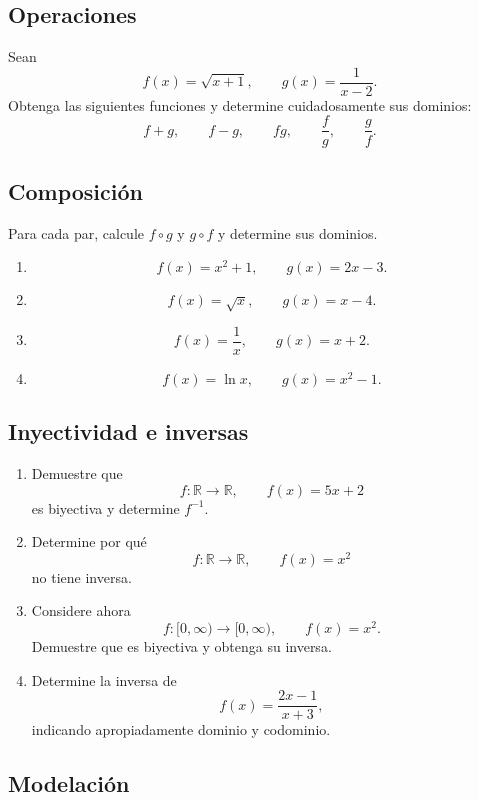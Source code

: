 \documentclass[12pt]{article}
\theoremstyle{remark}
\newcommand{\R}{\mathbb{R}}
\begin{document}
\subsection{Operaciones}

Sean
\[
f(x)=\sqrt{x+1},
\qquad
g(x)=\frac{1}{x-2}.
\]
Obtenga las siguientes funciones y determine cuidadosamente sus dominios:
\[
f+g,\qquad f-g,\qquad fg,\qquad\frac fg,\qquad\frac gf.
\]

\subsection{Composición}

Para cada par, calcule $f\circ g$ y $g\circ f$ y determine sus dominios.

\begin{enumerate}
    \item
    \[
    f(x)=x^2+1,\qquad g(x)=2x-3.
    \]
    \item
    \[
    f(x)=\sqrt{x},\qquad g(x)=x-4.
    \]
    \item
    \[
    f(x)=\frac1x,\qquad g(x)=x+2.
    \]
    \item
    \[
    f(x)=\ln x,\qquad g(x)=x^2-1.
    \]
\end{enumerate}

\subsection{Inyectividad e inversas}

\begin{enumerate}
    \item Demuestre que
    \[
    f:\R\to\R,\qquad f(x)=5x+2
    \]
    es biyectiva y determine $f^{-1}$.

    \item Determine por qué
    \[
    f:\R\to\R,\qquad f(x)=x^2
    \]
    no tiene inversa.

    \item Considere ahora
    \[
    f:[0,\infty)\to[0,\infty),\qquad f(x)=x^2.
    \]
    Demuestre que es biyectiva y obtenga su inversa.

    \item Determine la inversa de
    \[
    f(x)=\frac{2x-1}{x+3},
    \]
    indicando apropiadamente dominio y codominio.
\end{enumerate}

\subsection{Modelación}
\end{document}
